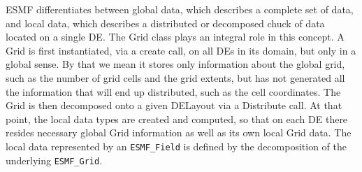 ESMF differentiates between global data, which describes a complete set of data,
and local data, which describes a distributed or decomposed chuck of data located
on a single DE.  The Grid class plays an integral role in this concept.  A Grid
is first instantiated, via a create call, on all DEs in its domain, but only in
a global sense.  By that we mean it stores only information about the global grid,
such as the number of grid cells and the grid extents, but has not generated all
the information that will end up distributed, such as the cell coordinates.  The
Grid is then decomposed onto a given DELayout via a Distribute call.  At that
point, the local data types are created and computed, so that on each DE there
resides necessary global Grid information as well as its own local Grid data.
The local data represented by an {\tt ESMF\_Field} is defined by the decomposition
of the underlying {\tt ESMF\_Grid}.

